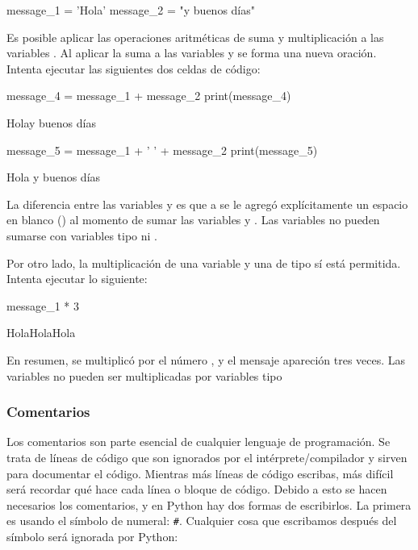 \begin{pyin}
message_1 = 'Hola'
message_2 = "y buenos días" 
\end{pyin}

Es posible aplicar las operaciones aritméticas de suma y multiplicación a las variables . Al aplicar la suma a las variables  y  se forma una nueva oración. Intenta ejecutar las siguientes dos celdas de código:

\begin{pyin}
message_4 = message_1 + message_2
print(message_4)
\end{pyin}

\begin{pyprint}
Holay buenos días
\end{pyprint}

\begin{pyin}
message_5 = message_1 + ' ' + message_2
print(message_5)
\end{pyin}
    
\begin{pyprint}
Hola y buenos días
\end{pyprint}

La diferencia entre las variables  y  es que a  se le agregó explícitamente un espacio en blanco () al momento de sumar las variables  y . Las variables  no pueden sumarse con variables tipo  ni .


Por otro lado, la multiplicación de una variable  y una de tipo  sí está permitida. Intenta ejecutar lo siguiente:

\begin{pyin}
message_1 * 3
\end{pyin}

\begin{pyout}
HolaHolaHola
\end{pyout}

En resumen, se multiplicó  por el número , y el mensaje apareción tres veces. Las variables  no pueden ser multiplicadas por variables tipo 


\subsubsection{Comentarios}

Los comentarios son parte esencial de cualquier lenguaje de programación. Se trata de líneas de código que son ignorados por el intérprete/compilador y sirven para documentar el código. Mientras más líneas de código escribas, más difícil será recordar qué hace cada línea o bloque de código. Debido a esto se hacen necesarios los comentarios, y en Python hay dos formas de escribirlos. La primera es usando el símbolo de numeral: \texttt{#}. Cualquier cosa que escribamos después del símbolo será ignorada por Python:

